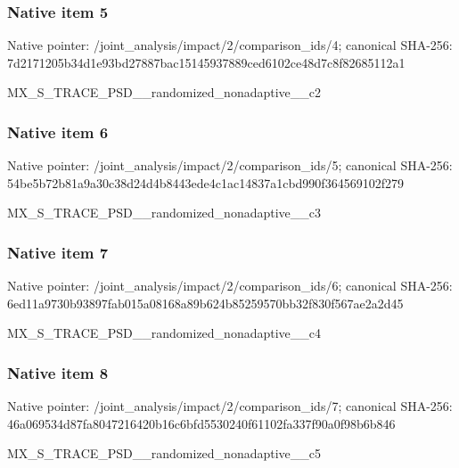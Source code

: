 \documentclass[10pt,a4paper]{article}
\begin{document}
\subsubsection{Native item 5}
Native pointer: /joint\_\allowbreak{}analysis/impact/2/comparison\_\allowbreak{}ids/4; canonical SHA-256: 7d2171205b34d1e93bd27887bac15145937889ced6102ce48d7c8f82685112a1

\begingroup\raggedright\sloppy MX\_\allowbreak{}S\_\allowbreak{}TRACE\_\allowbreak{}PSD\_\allowbreak{}\_\allowbreak{}randomized\_\allowbreak{}nonadaptive\_\allowbreak{}\_\allowbreak{}c2\par\endgroup

\subsubsection{Native item 6}
Native pointer: /joint\_\allowbreak{}analysis/impact/2/comparison\_\allowbreak{}ids/5; canonical SHA-256: 54be5b72b81a9a30c38d24d4b8443ede4c1ac14837a1cbd990f364569102f279

\begingroup\raggedright\sloppy MX\_\allowbreak{}S\_\allowbreak{}TRACE\_\allowbreak{}PSD\_\allowbreak{}\_\allowbreak{}randomized\_\allowbreak{}nonadaptive\_\allowbreak{}\_\allowbreak{}c3\par\endgroup

\subsubsection{Native item 7}
Native pointer: /joint\_\allowbreak{}analysis/impact/2/comparison\_\allowbreak{}ids/6; canonical SHA-256: 6ed11a9730b93897fab015a08168a89b624b85259570bb32f830f567ae2a2d45

\begingroup\raggedright\sloppy MX\_\allowbreak{}S\_\allowbreak{}TRACE\_\allowbreak{}PSD\_\allowbreak{}\_\allowbreak{}randomized\_\allowbreak{}nonadaptive\_\allowbreak{}\_\allowbreak{}c4\par\endgroup

\subsubsection{Native item 8}
Native pointer: /joint\_\allowbreak{}analysis/impact/2/comparison\_\allowbreak{}ids/7; canonical SHA-256: 46a069534d87fa8047216420b16c6bfd5530240f61102fa337f90a0f98b6b846

\begingroup\raggedright\sloppy MX\_\allowbreak{}S\_\allowbreak{}TRACE\_\allowbreak{}PSD\_\allowbreak{}\_\allowbreak{}randomized\_\allowbreak{}nonadaptive\_\allowbreak{}\_\allowbreak{}c5\par\endgroup
\end{document}
